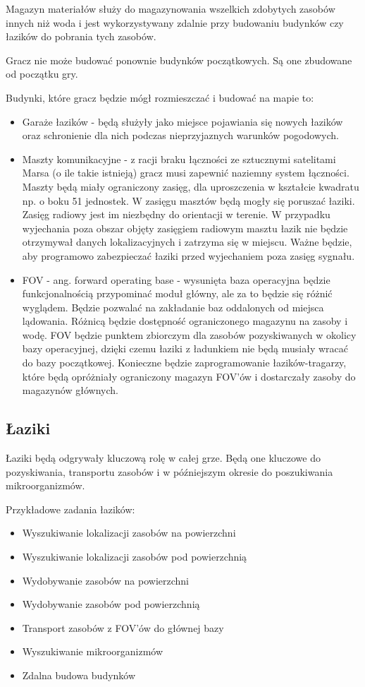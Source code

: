 \documentclass[a4paper,12pt]{article}
\begin{document}
Magazyn materiałów służy do magazynowania wszelkich zdobytych zasobów innych niż woda i jest wykorzystywany zdalnie przy budowaniu budynków czy łazików do pobrania tych zasobów.

Gracz nie może budować ponownie budynków początkowych. Są one zbudowane od początku gry.

Budynki, które gracz będzie mógł rozmieszczać i budować na mapie to:
\begin{itemize}
	\item Garaże łazików - będą służyły jako miejsce pojawiania się nowych łazików oraz schronienie dla nich podczas nieprzyjaznych warunków pogodowych.
	\item Maszty komunikacyjne - z racji braku łączności ze sztucznymi satelitami Marsa (o ile takie istnieją) gracz musi zapewnić naziemny system łączności. Maszty będą miały ograniczony zasięg, dla uproszczenia w kształcie kwadratu np. o boku 51 jednostek. W zasięgu masztów będą mogły się poruszać łaziki. Zasięg radiowy jest im niezbędny do orientacji w terenie. W przypadku wyjechania poza obszar objęty zasięgiem radiowym masztu łazik nie będzie otrzymywał danych lokalizacyjnych i zatrzyma się w miejscu. Ważne będzie, aby programowo zabezpieczać łaziki przed wyjechaniem poza zasięg sygnału.
	\item FOV - ang. forward operating base - wysunięta baza operacyjna będzie funkcjonalnością przypominać moduł główny, ale za to będzie się różnić wyglądem. Będzie pozwalać na zakładanie baz oddalonych od miejsca lądowania. Różnicą będzie dostępność ograniczonego magazynu na zasoby i wodę. FOV będzie punktem zbiorczym dla zasobów pozyskiwanych w okolicy bazy operacyjnej, dzięki czemu łaziki z ładunkiem nie będą musiały wracać do bazy początkowej. Konieczne będzie zaprogramowanie łazików-tragarzy, które będą opróżniały ograniczony magazyn FOV'ów i dostarczały zasoby do magazynów głównych.
\end{itemize}
\subsection{Łaziki}
Łaziki będą odgrywały kluczową rolę w całej grze. Będą one kluczowe do pozyskiwania, transportu zasobów i w późniejszym okresie do poszukiwania mikroorganizmów.

Przykładowe zadania łazików:
\begin{itemize}
	\item Wyszukiwanie lokalizacji zasobów na powierzchni
	\item Wyszukiwanie lokalizacji zasobów pod powierzchnią
	\item Wydobywanie zasobów na powierzchni
	\item Wydobywanie zasobów pod powierzchnią
	\item Transport zasobów z FOV'ów do głównej bazy
	\item Wyszukiwanie mikroorganizmów
	\item Zdalna budowa budynków
\end{itemize}
\end{document}
